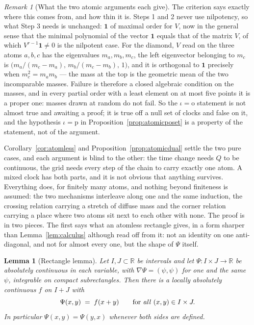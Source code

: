 \documentclass[11pt,a4paper]{article}
\theoremstyle{plain}
\newtheorem{lemma}[theorem]{Lemma}
\theoremstyle{definition}
\theoremstyle{remark}
\newtheorem{remark}[theorem]{Remark}
\newcommand{\R}{\mathbb{R}}
\newcommand{\one}{\mathbf{1}}
\begin{document}
\begin{remark}[What the two atomic arguments each give]
  The criterion says exactly where this comes from, and how thin it is.  Steps 1
  and 2 never use nilpotency, so what Step 3 needs is unchanged: $\one$ of
  maximal order for $V$, now in the general sense that the minimal polynomial of
  the vector $\one$ equals that of the matrix $V$, of which
  $V^{r-1}\one \neq 0$ is the nilpotent case.  For the diamond, $V$ read on the
  three atoms $a,b,c$ has the eigenvalues $m_a, m_b, m_c$, the left eigenvector
  belonging to $m_c$ is
  $\bigl(m_a/(m_c-m_a),\, m_b/(m_c-m_b),\, 1\bigr)$, and it is orthogonal to
  $\one$ precisely when $m_c^2 = m_a m_b$ --- the mass at the top is the
  geometric mean of the two incomparable masses.  Failure is therefore a closed
  algebraic condition on the masses, and in every partial order with a least
  element on at most five points it is a proper one: masses drawn at random do
  not fail.  So the $\iota = \mathrm{o}$ statement is not almost true and
  awaiting a proof; it is true off a null set of clocks and false on it, and the
  hypothesis $\iota = \mathrm{p}$ in Proposition~\ref{prop:atomicposet} is a
  property of the statement, not of the argument.
\end{remark}

Corollary~\ref{cor:atomless} and Proposition~\ref{prop:atomicdual} settle the two
pure cases, and each argument is blind to the other: the time change needs $Q$
to be continuous, the grid needs every step of the chain to carry exactly one
atom.  A mixed clock has both parts, and it is not obvious that anything
survives.  Everything does, for finitely many atoms, and nothing beyond
finiteness is assumed: the two mechanisms interleave along one and the same
induction, the crossing relation carrying a stretch of diffuse mass and the
corner relation carrying a place where two atoms sit next to each other with
none.
The proof is in two pieces.  The first says what an atomless rectangle gives,
in a form sharper than Lemma~\ref{lem:calculus} although read off from it:
not an identity on one anti-diagonal, and not for almost every one, but the
shape of $\Psi$ itself.

\begin{lemma}[Rectangle lemma]
  \label{lem:rectangle}
  Let $I, J \subset \R$ be intervals and let $\Psi : I \times J \to \R$ be
  absolutely continuous in each variable, with $\nabla \Psi = (\psi,\psi)$ for
  one and the same $\psi$, integrable on compact subrectangles.  Then there is a
  locally absolutely continuous $f$ on $I + J$ with
  \[
    \Psi(x,y) \;=\; f(x+y) \qquad \text{for \emph{all} } (x,y) \in I \times J .
  \]
  In particular $\Psi(x,y) = \Psi(y,x)$ whenever both sides are defined.
\end{lemma}
\end{document}
